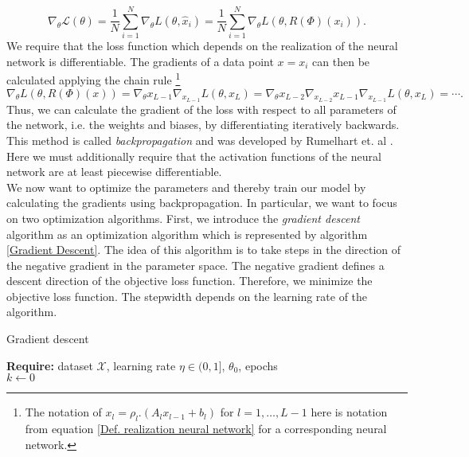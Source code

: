 \documentclass[11pt,titlepage]{article}
\theoremstyle{definition}
\theoremstyle{remark}
\begin{document}
	\[\nabla_\theta \mathcal{L}(\theta) = \frac{1}{N} \sum_{i=1}^N \nabla_\theta L(\theta, \hat{x}_i) = \frac{1}{N} \sum_{i=1}^N \nabla_\theta L(\theta, R(\Phi)(x_i)).\]
	We require that the loss function which depends on the realization of the neural network is differentiable. The gradients of a data point $x = x_i$ can then be calculated applying the chain rule \footnote{The notation of $x_l = \rho_l.(A_l x_{l-1} + b_l)$ for $l=1,\ldots, L-1$ here is notation from equation \ref{Def. realization neural network} for a corresponding neural network.}
	\[ \nabla_\theta L(\theta, R(\Phi)(x)) = \nabla_\theta x_{L-1} \nabla_{x_{L-1}} L(\theta,x_L) = \nabla_\theta x_{L-2} \nabla_{x_{L-2}} x_{L-1} \nabla_{x_{L-1}}L(\theta, x_L) = \cdots .\]%
	Thus, we can calculate the gradient of the loss with respect to all parameters of the network, i.e. the weights and biases, by differentiating iteratively backwards. This method is called \textsl{backpropagation} and was developed by Rumelhart et. al \cite{Rumelhart1986}.
	Here we must additionally require that the activation functions of the neural network are at least piecewise differentiable. \\
	We now want to optimize the parameters and thereby train our model by calculating the gradients using backpropagation. 
	In particular, we want to focus on two optimization algorithms. First, we introduce the \textsl{gradient descent} algorithm  as an optimization algorithm which is represented by algorithm \ref{Gradient Descent}. The idea of this algorithm is to take steps in the direction of the negative gradient in the parameter space. The negative gradient defines a descent direction of the objective loss function. Therefore, we minimize the objective loss function. The stepwidth depends on the learning rate of the algorithm.
	
	\begin{algorithm}
		\caption{Gradient descent} \label{Gradient Descent}
		\textbf{Require:} dataset $\mathcal{X}$, learning rate $\eta\in (0,1]$, $\theta_0$, epochs\\
		$k\gets 0$\\
	\end{algorithm}
	
\end{document}
